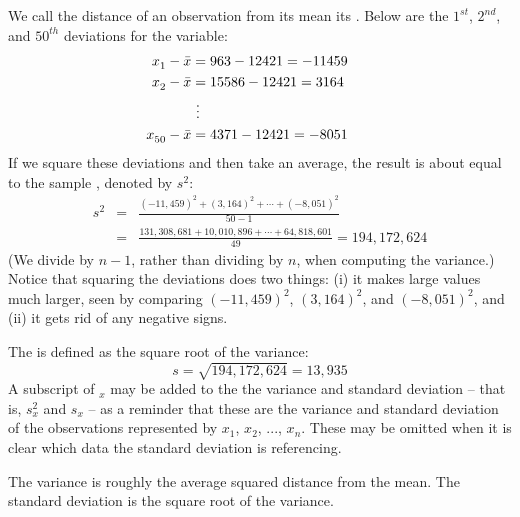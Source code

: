 We call the distance of an observation from its mean its . Below are the $1^{st}_{}$, $2^{nd}_{}$, and $50^{th}_{}$ deviations for the  variable:
\begin{align*}
x_1^{}-\bar{x} &= 963 - 12421 = -11459 \hspace{5mm}\text{ } \\
x_2^{}-\bar{x} &= 15586 - 12421 = 3164 \\
			&\ \vdots \\
x_{50}^{}-\bar{x} &= 4371 - 12421 = -8051
\end{align*}
If we square these deviations and then take an average, the result is about equal to the sample \label{varianceIsDefined}, denoted by $s_{}^2$:
\begin{eqnarray*}
s_{}^2 &=& \frac{(-11,459)_{}^2 + (3,164)_{}^2 + \cdots + (-8,051)_{}^2}{50-1} \\
	&=& \frac{131,308,681 + 10,010,896 + \cdots + 64,818,601}{49} = 194,172,624
\end{eqnarray*}
(We divide by $n-1$, rather than dividing by $n$, when computing the variance.) Notice that squaring the deviations does two things: (i) it makes large values much larger, seen by comparing $(-11,459)^2$, $(3,164)^2$, and $(-8,051)^2$, and (ii) it gets rid of any negative signs.

The  is defined as the square root of the variance:
$$s=\sqrt{194,172,624} = 13,935$$
A subscript of $_x$ may be added to the the variance and standard deviation -- that is, $s_x^2$ and $s_x^{}$ -- as a reminder that these are the variance and standard deviation of the observations represented by $x_1^{}$, $x_2^{}$, ..., $x_n^{}$. These may be omitted when it is clear which data the standard deviation is referencing.

\begin{termBox}{
The variance is roughly the average squared distance from the mean. The standard deviation is the square root of the variance.}
\end{termBox}

